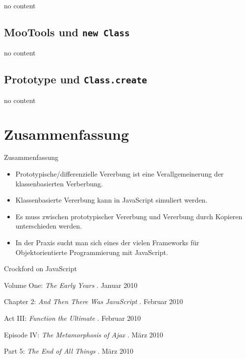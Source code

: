 \begin{frame}
  no content
\end{frame}

\subsection{MooTools und \texttt{new Class}}

\begin{frame}
  no content
\end{frame}

\subsection{Prototype und \texttt{Class.create}}

\begin{frame}
  no content
\end{frame}

\section*{Zusammenfassung}

\begin{frame}{Zusammenfassung}
  \begin{itemize}
    \item \alert{Prototypische/differenzielle Vererbung} ist eine \alert{Verallgemeinerung} der
      klassenbasierten Verberbung.
    \item \alert{Klassenbasierte Vererbung} kann in JavaScript \alert{simuliert} werden.
    \item Es muss zwischen \alert{prototypischer Vererbung} und \alert{Vererbung durch
      Kopieren} unterschieden werden.
    \item In der Praxis sucht man sich eines der \alert{vielen Frameworks} für
      \alert{Objektorientierte Programmierung mit JavaScript}.
  \end{itemize} 
\end{frame}

\begin{frame}{Crockford on JavaScript}
  \begin{thebibliography}{1}
     Volume One:
    \emph{The Early Years}
    . Januar 2010
    
     Chapter 2:
    \emph{And Then There Was JavaScript}
    . Februar 2010
    
     Act III:
    \emph{Function the Ultimate}
    . Februar 2010
    
     Episode IV:
    \emph{The Metamorphosis of Ajax}
    . März 2010
    
     Part 5:
    \emph{The End of All Things}
    . März 2010
    
  \end{thebibliography}
\end{frame}

